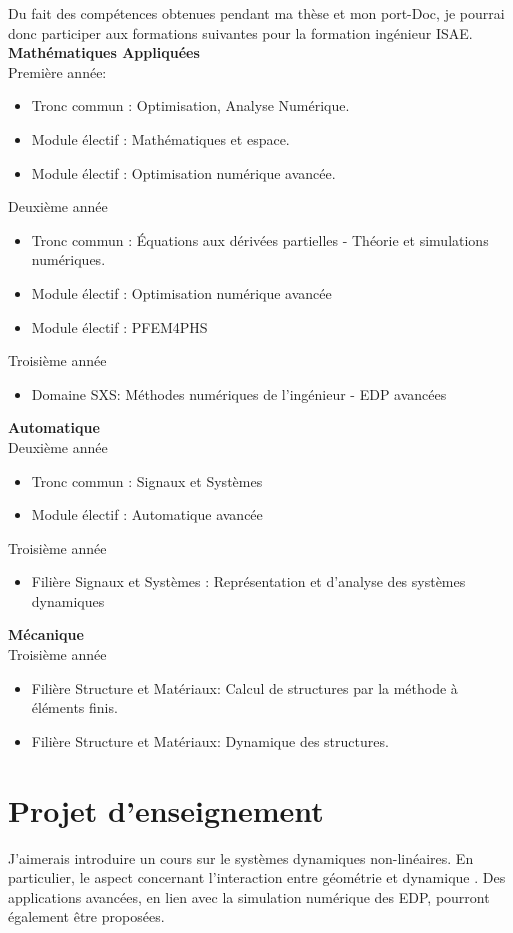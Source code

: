 \documentclass[12pt, french]{article}
\begin{document}
Du fait des compétences obtenues pendant ma thèse et mon port-Doc, je pourrai donc participer aux formations suivantes pour la formation ingénieur ISAE. \\

\textbf{Mathématiques Appliquées} \\
Première année: 
\begin{itemize}
	\item Tronc commun : Optimisation, Analyse Numérique.
	\item Module électif : Mathématiques et espace.
	\item  Module électif : Optimisation numérique avancée.
\end{itemize}
Deuxième année
\begin{itemize}
	\item Tronc commun : Équations aux dérivées partielles - Théorie et simulations numériques.
	\item Module électif : Optimisation numérique avancée
	\item Module électif : PFEM4PHS
\end{itemize}
Troisième année
\begin{itemize}
	\item Domaine SXS: Méthodes numériques de l'ingénieur - EDP avancées
\end{itemize}

\textbf{Automatique} \\ 
Deuxième année
\begin{itemize}
	\item Tronc commun : Signaux et Systèmes
	\item Module électif : Automatique avancée
\end{itemize}
Troisième année
\begin{itemize}
	\item Filière Signaux et Systèmes :  Représentation et d'analyse des systèmes dynamiques
\end{itemize}

\textbf{Mécanique} \\
Troisième année
\begin{itemize}
	\item Filière Structure et Matériaux: Calcul de structures par la méthode à éléments finis.
	\item Filière Structure et Matériaux: Dynamique des structures.
\end{itemize}


\section{Projet d'enseignement}
J'aimerais introduire un cours sur le systèmes dynamiques non-linéaires. En particulier, le aspect concernant l'interaction entre géométrie et dynamique \cite{wiggins2003introduction,haddad2011nonlinear}. Des applications avancées, en lien avec la simulation numérique des EDP, pourront également être proposées.


	
	
	
	
\end{document}
